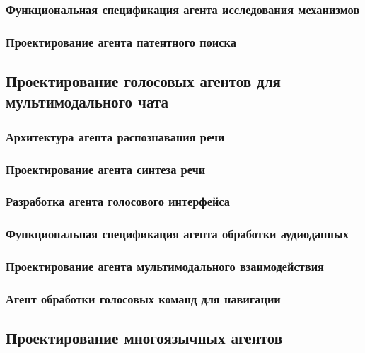 \documentclass{syksu-coursework}
\begin{document}
\subsubsection{Функциональная спецификация агента исследования механизмов}

\subsubsection{Проектирование агента патентного поиска}

\subsection{Проектирование голосовых агентов для мультимодального чата}

\subsubsection{Архитектура агента распознавания речи}

\subsubsection{Проектирование агента синтеза речи}

\subsubsection{Разработка агента голосового интерфейса}

\subsubsection{Функциональная спецификация агента обработки аудиоданных}

\subsubsection{Проектирование агента мультимодального взаимодействия}

\subsubsection{Агент обработки голосовых команд для навигации}

\subsection{Проектирование многоязычных агентов}
\end{document}
